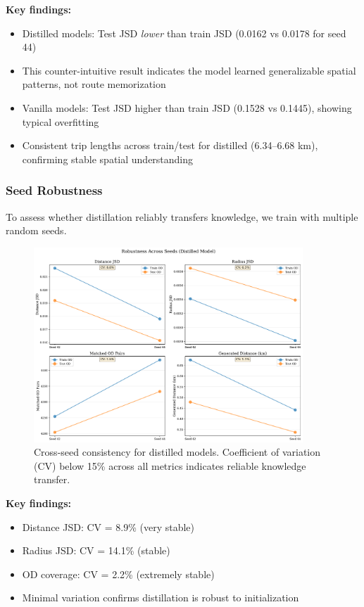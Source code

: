 \textbf{Key findings:}
\begin{itemize}[noitemsep,topsep=0pt]
    \item Distilled models: Test JSD \emph{lower} than train JSD (0.0162 vs 0.0178 for seed 44)
    \item This counter-intuitive result indicates the model learned generalizable spatial patterns, not route memorization
    \item Vanilla models: Test JSD higher than train JSD (0.1528 vs 0.1445), showing typical overfitting
    \item Consistent trip lengths across train/test for distilled (6.34--6.68 km), confirming stable spatial understanding
\end{itemize}

\subsubsection{Seed Robustness}

To assess whether distillation reliably transfers knowledge, we train with multiple random seeds.

\begin{figure}[h]
    \centering
    \includegraphics[width=0.9\textwidth]{assets/plots/hoser/seed_robustness.pdf}
    \caption{Cross-seed consistency for distilled models. Coefficient of variation (CV) below 15\% across all metrics indicates reliable knowledge transfer.}
    \label{fig:seed-robustness}
\end{figure}

\textbf{Key findings:}
\begin{itemize}[noitemsep,topsep=0pt]
    \item Distance JSD: CV = 8.9\% (very stable)
    \item Radius JSD: CV = 14.1\% (stable)
    \item OD coverage: CV = 2.2\% (extremely stable)
    \item Minimal variation confirms distillation is robust to initialization
\end{itemize}

